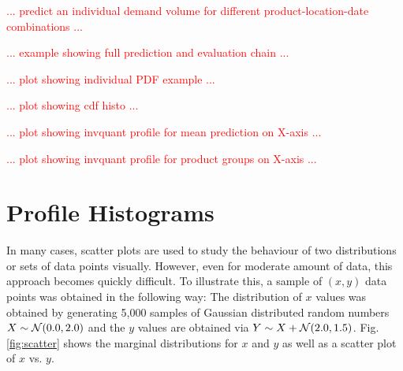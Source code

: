\documentclass[BCOR=1mm, DIV=calc,10pt,
twoside=true,
twocolumn,
headings=normal]{scrartcl}
\newcommand{\fig}{Fig. }
\begin{document}
\textcolor{red}{... predict an individual demand volume for different product-location-date combinations ...}

\textcolor{red}{... example showing full prediction and evaluation chain ...}

\textcolor{red}{... plot showing individual PDF example ...}


\textcolor{red}{... plot showing cdf histo ...}


\textcolor{red}{... plot showing invquant profile for mean prediction on X-axis ...}


\textcolor{red}{... plot showing invquant profile for product groups on X-axis ...}






\appendix

\section{Profile Histograms}

In many cases, scatter plots are used to study the behaviour of two distributions or sets of data points visually. However, even for moderate amount of data, this approach becomes quickly difficult. To illustrate this, a sample of $(x,y)$ data points was obtained in the following way: The distribution of $x$ values was obtained by generating 5,000 samples of Gaussian distributed random numbers $X \sim {\cal N}(0.0,2.0)$ and the $y$ values are obtained via $Y \sim X +  {\cal N}(2.0,1.5)$. \fig \ref{fig:scatter} shows the marginal distributions for $x$ and $y$ as well as a scatter plot of $x$ vs. $y$.
\end{document}
